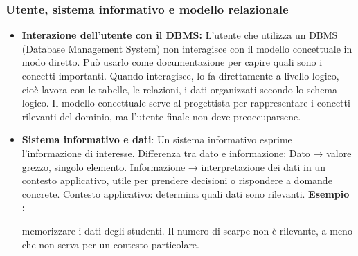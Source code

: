 \documentclass{article}
\newcounter{esempio}
\newenvironment{esempio}{
	\refstepcounter{esempio}%
	\noindent\textbf{Esempio \theesempio:}
}{\par}
\begin{document}
\subsubsection{Utente, sistema informativo e modello relazionale}\begin{itemize}


\item\textbf{Interazione dell'utente con il DBMS:} L'utente che utilizza un DBMS (Database Management System) non interagisce con il modello concettuale in modo diretto. Può usarlo come documentazione per capire quali sono i concetti importanti. Quando interagisce, lo fa direttamente a livello logico, cioè lavora con le tabelle, le relazioni, i dati organizzati secondo lo schema logico. Il modello concettuale serve al progettista per rappresentare i concetti rilevanti del dominio, ma l'utente
finale non deve preoccuparsene.

\item\textbf{Sistema informativo e dati}: Un sistema informativo esprime l'informazione di interesse. Differenza tra dato e informazione: Dato → valore grezzo, singolo elemento. Informazione → interpretazione dei dati in un contesto applicativo, utile per prendere decisioni o
rispondere a domande concrete. Contesto applicativo: determina quali dati sono rilevanti. \begin{esempio}
	memorizzare i dati degli studenti. Il numero di scarpe non è rilevante, a meno che non serva per un contesto particolare.
\end{esempio}


\end{itemize}
\end{document}
